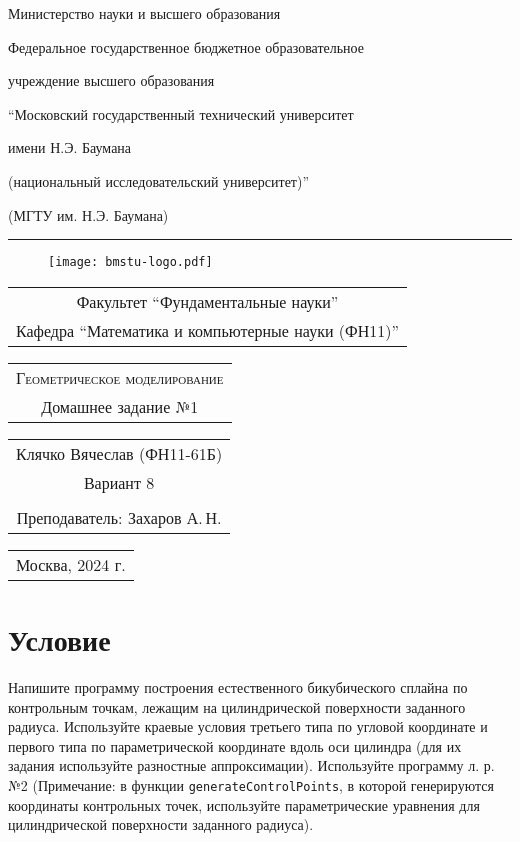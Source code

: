 \documentclass[12pt]{article}
\begin{document}
\pagestyle{empty}
\centerline{\large Министерство науки и высшего образования}  
\centerline{\large Федеральное государственное бюджетное образовательное}
\centerline{\large учреждение высшего образования}
\centerline{\large ``Московский государственный технический университет}
\centerline{\large имени Н.Э. Баумана}
\centerline{\large (национальный исследовательский университет)''}
\centerline{\large (МГТУ им. Н.Э. Баумана)}
\hrule
\vspace{0.5cm}
\begin{figure}[h]
\center
\texttt{[image: bmstu-logo.pdf]}
\end{figure}
\begin{center}
  \large  
  \begin{tabular}{c}
    Факультет ``Фундаментальные науки'' \\
    Кафедра ``Математика и компьютерные науки (ФН11)''    
  \end{tabular}
\end{center}
\vspace{0.5cm}
\begin{center}
  \LARGE \bf  
  \begin{tabular}{c}
    \textsc{Геометрическое моделирование} \\
    Домашнее задание №1 \\
  \end{tabular}
\end{center}
\vspace{0.5cm}
\begin{center}
  \large  
  \begin{tabular}{c}
    Клячко Вячеслав (ФН11-61Б) \\ %
    Вариант 8 \\ \\ %
    Преподаватель: Захаров А.\,Н.
  \end{tabular}
\end{center}
\vfill
\begin{center}
  \large  
  \begin{tabular}{c}
    Москва, 
    2024 г.
  \end{tabular}
\end{center}
\pagebreak



\section*{Условие}
Напишите программу построения естественного бикубического сплайна по контрольным
точкам, лежащим на цилиндрической поверхности заданного радиуса. Используйте
краевые условия третьего типа по угловой координате и 
первого %
типа по параметрической координате вдоль оси цилиндра (для их задания используйте
разностные аппроксимации). Используйте программу л. р. №2 (Примечание: в функции
\texttt{generateControlPoints}, в которой генерируются координаты контрольных точек, используйте параметрические уравнения для цилиндрической поверхности заданного радиуса).
\end{document}
